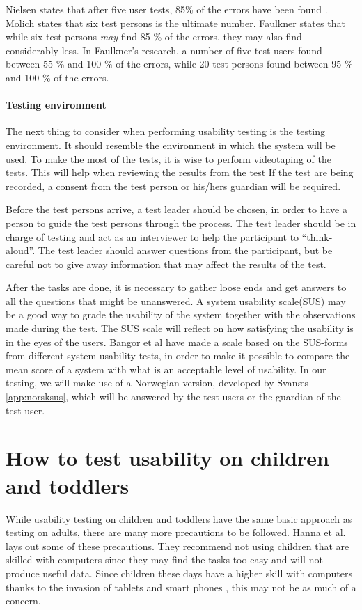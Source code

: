 Nielsen states that after five user tests, 85\% of the errors have been found \cite{nielsennumberoftests}. Molich\cite{molich2008usable} states that six test persons is the ultimate number. Faulkner \cite{faulkner2003beyond} states that while six test persons \textit{may} find 85 \% of the errors, they may also find considerably less. In Faulkner's research, a number of five test users found between 55 \% and 100 \% of the errors, while 20 test persons found between 95 \% and 100 \% of the errors. 

\paragraph{Testing environment}
\label{par:testingenvironment}
The next thing to consider when performing usability testing is the testing environment. It should resemble the environment in which the system will be used. To make the most of the tests, it is wise to perform videotaping of the tests. This will help when reviewing the results from the test If the test are being recorded, a consent from the test person or his/hers guardian will be required.

Before the test persons arrive, a test leader should be chosen, in order to have a person to guide the test persons through the process. The test leader should be in charge of testing and act as an interviewer to help the participant to ``think-aloud''\cite{lewis1982using}. The test leader should answer questions from the participant, but be careful not to give away information that may affect the results of the test.

After the tasks are done, it is necessary to gather loose ends and get answers to all the questions that might be unanswered. A system usability scale(SUS)\cite{sus} may be a good way to grade the usability of the system together with the observations made during the test. The SUS scale will reflect on how satisfying the usability is in the eyes of the users. Bangor et al \cite{susform} have made a scale based on the SUS-forms from different system usability tests, in order to make it possible to compare the mean score of a system with what is an acceptable level of usability. In our testing, we will make use of a Norwegian version, developed by Svan\ae s \ref{app:norsksus}, which will be answered by the test users or the guardian of the test user.

\section{How to test usability on children and toddlers}
\label{sec:usabilitytestchildren}
While usability testing on children and toddlers have the same basic approach as testing on adults, there are many more precautions to be followed. 
Hanna et al. \cite{testingenvironmentforchildren} lays out some of these precautions. They recommend not using children that are skilled with computers since they may find the tasks too easy and will not produce useful data. 
Since children these days have a higher skill with computers thanks to the invasion of tablets and smart phones \cite{babiesusageoftablets}, this may not be as much of a concern. 

